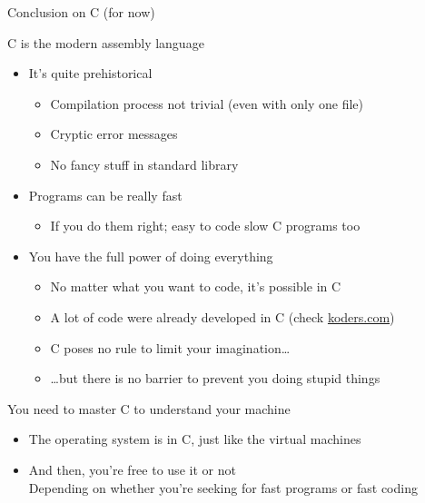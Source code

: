 \begin{frame}{Conclusion on C (for now)}
  \begin{block}{C is the modern assembly language}
    \begin{itemize}
    \item It's quite prehistorical
      \begin{itemize}
      \item Compilation process not trivial (even with only one file)
      \item Cryptic error messages
      \item No fancy stuff in standard library
      \end{itemize}
    \item Programs can be really fast
      \begin{itemize}
      \item If you do them right; easy to code slow C programs too
      \end{itemize}
    \item You have the full power of doing everything
      \begin{itemize}
      \item No matter what you want to code, it's possible in C
      \item A lot of code were already developed in C (check \url{koders.com})
      \item C poses no rule to limit your imagination\ldots
      \item \ldots but there is no barrier to prevent you doing stupid things
      \end{itemize}
    \end{itemize}
  \end{block}
  \begin{block}{You need to master C to understand your machine}
    \begin{itemize}
    \item The operating system is in C, just like the virtual machines
    \item And then, you're free to use it or not\\
      Depending on whether you're seeking for fast programs or fast coding
    \end{itemize}
  \end{block}
\end{frame}
